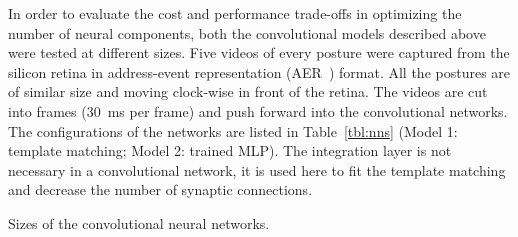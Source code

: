 \documentclass[journal]{journal}
\begin{document}
In order to evaluate the cost and performance trade-offs in optimizing the number of neural components, both the convolutional models described above were tested at different sizes. 
Five videos of every posture were captured from the silicon retina in address-event representation (AER~\cite{lazzaro1995multi}) format.  
All the postures are of similar size and moving clock-wise in front of the retina. 
The videos are cut into frames (30~ms per frame) and push forward into the convolutional networks. 
The configurations of the networks are listed in Table~\ref{tbl:nns} (Model 1: template matching; Model 2: trained MLP). 
The integration layer is not necessary in a convolutional network, it is used here to fit the template matching and decrease the number of synaptic connections.

\begin{table}
\caption{Sizes of the convolutional neural networks.}
	\begin{subtable}{0.5\textwidth}
		

\end{subtable}
\end{table}
\end{document}
